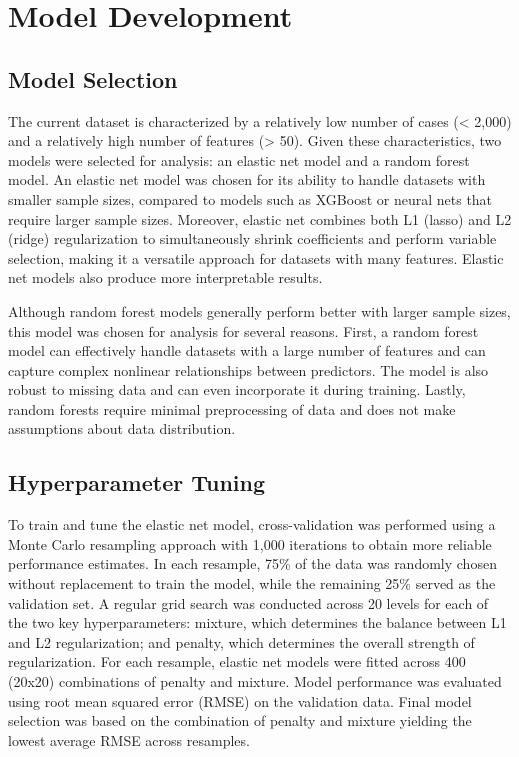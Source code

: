 \documentclass[sn-basic,pdflatex]{sn-jnl}
\begin{document}
\section{Model Development}\label{model-development}

\subsection{Model Selection}\label{model-selection}

The current dataset is characterized by a relatively low number of cases
(\textless{} 2,000) and a relatively high number of features
(\textgreater{} 50). Given these characteristics, two models were
selected for analysis: an elastic net model and a random forest model.
An elastic net model was chosen for its ability to handle datasets with
smaller sample sizes, compared to models such as XGBoost or neural nets
that require larger sample sizes. Moreover, elastic net combines both L1
(lasso) and L2 (ridge) regularization to simultaneously shrink
coefficients and perform variable selection, making it a versatile
approach for datasets with many features. Elastic net models also
produce more interpretable results.

Although random forest models generally perform better with larger
sample sizes, this model was chosen for analysis for several reasons.
First, a random forest model can effectively handle datasets with a
large number of features and can capture complex nonlinear relationships
between predictors. The model is also robust to missing data and can
even incorporate it during training. Lastly, random forests require
minimal preprocessing of data and does not make assumptions about data
distribution.

\subsection{Hyperparameter Tuning}\label{hyperparameter-tuning}

To train and tune the elastic net model, cross-validation was performed
using a Monte Carlo resampling approach with 1,000 iterations to obtain
more reliable performance estimates. In each resample, 75\% of the data
was randomly chosen without replacement to train the model, while the
remaining 25\% served as the validation set. A regular grid search was
conducted across 20 levels for each of the two key hyperparameters:
mixture, which determines the balance between L1 and L2 regularization;
and penalty, which determines the overall strength of regularization.
For each resample, elastic net models were fitted across 400 (20x20)
combinations of penalty and mixture. Model performance was evaluated
using root mean squared error (RMSE) on the validation data. Final model
selection was based on the combination of penalty and mixture yielding
the lowest average RMSE across resamples.
\end{document}
